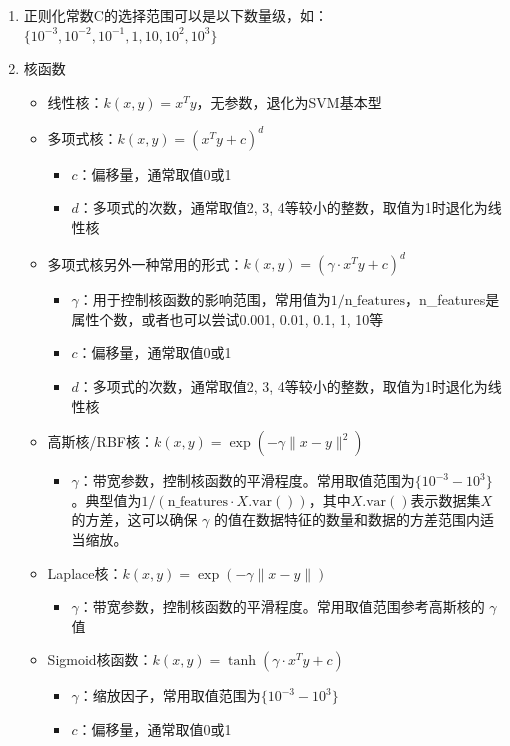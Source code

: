 \documentclass[12pt]{article}
\begin{document}
\begin{enumerate}
  \item

        正则化常数C的选择范围可以是以下数量级，如：\(\{10^{-3}, 10^{-2}, 10^{-1}, 1, 10, 10^2, 10^3\}\)
  \item
        核函数
        \begin{itemize}
          \item 线性核：\(k(x,y) = x^T y\)，无参数，退化为SVM基本型
          \item 多项式核：\(k(x,y) = (x^T y + c)^d\)
                \begin{itemize}
                  \item \(c\)：偏移量，通常取值0或1
                  \item \(d\)：多项式的次数，通常取值2, 3, 4等较小的整数，取值为1时退化为线性核
                \end{itemize}
          \item 多项式核另外一种常用的形式：\(k(x,y) = (\gamma \cdot x^T y + c)^d\)
                \begin{itemize}
                  \item \(\gamma\)：用于控制核函数的影响范围，常用值为\(1/\text{n\_features}\)，n\_features是属性个数，或者也可以尝试0.001, 0.01, 0.1, 1, 10等
                  \item \(c\)：偏移量，通常取值0或1
                  \item \(d\)：多项式的次数，通常取值2, 3, 4等较小的整数，取值为1时退化为线性核
                \end{itemize}
          \item 高斯核/RBF核：\(k(x,y) = \exp(-\gamma \|x - y\|^2)\)
                \begin{itemize}
                  \item \(\gamma\)：带宽参数，控制核函数的平滑程度。常用取值范围为\(\{10^{-3}-10^3\}\)。典型值为\(1/(\text{n\_features} \cdot X.\text{var}())\)，其中\(X.\text{var}()\)表示数据集\(X\)的方差，这可以确保 \(\gamma\) 的值在数据特征的数量和数据的方差范围内适当缩放。
                \end{itemize}
          \item Laplace核：\(k(x,y) = \exp(-\gamma \|x - y\|)\)
                \begin{itemize}
                  \item \(\gamma\)：带宽参数，控制核函数的平滑程度。常用取值范围参考高斯核的 \(\gamma\) 值
                \end{itemize}
          \item Sigmoid核函数：\(k(x,y) = \tanh(\gamma \cdot x^T y + c)\)
                \begin{itemize}
                  \item \(\gamma\)：缩放因子，常用取值范围为\(\{10^{-3}-10^3\}\)
                  \item \(c\)：偏移量，通常取值0或1
                \end{itemize}
        \end{itemize}
\end{enumerate}
\end{document}
